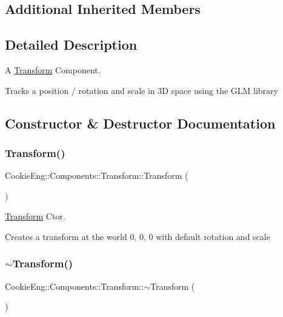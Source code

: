 \subsection*{Additional Inherited Members}


\subsection{Detailed Description}
A \hyperlink{class_cookie_eng_1_1_components_1_1_transform}{Transform} Component. 

Tracks a position / rotation and scale in 3D space using the G\+LM library 

\subsection{Constructor \& Destructor Documentation}
\mbox{\label{class_cookie_eng_1_1_components_1_1_transform_a477bc2eb1d09fecdcb7399d5124ccd0d}} 
\subsubsection{\texorpdfstring{Transform()}{Transform()}}
{\footnotesize\ttfamily Cookie\+Eng\+::\+Components\+::\+Transform\+::\+Transform (\begin{DoxyParamCaption}{ }\end{DoxyParamCaption})}



\hyperlink{class_cookie_eng_1_1_components_1_1_transform}{Transform} Ctor. 

Creates a transform at the world 0, 0, 0 with default rotation and scale \mbox{\label{class_cookie_eng_1_1_components_1_1_transform_ad07b4e7f04ec0c60646339be8b67c69c}} 
\subsubsection{\texorpdfstring{$\sim$\+Transform()}{~Transform()}}
{\footnotesize\ttfamily Cookie\+Eng\+::\+Components\+::\+Transform\+::$\sim$\+Transform (\begin{DoxyParamCaption}{ }\end{DoxyParamCaption})\hspace{0.3cm}{\ttfamily [inline]}}



